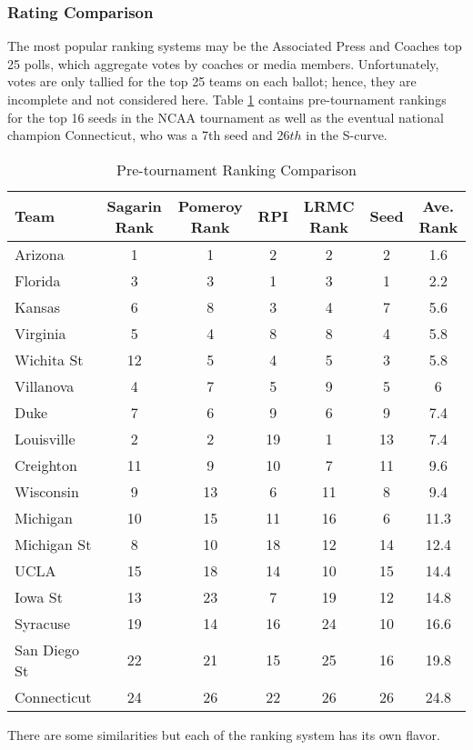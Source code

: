 \subsubsection{Rating Comparison}
The most popular ranking systems may be the Associated Press and Coaches top 25 polls, which aggregate votes by coaches or media members. Unfortunately, votes are only tallied for the top 25 teams on each ballot; hence, they are incomplete and not considered here. Table \ref{tab:ranks} contains pre-tournament rankings for the top 16 seeds in the NCAA tournament as well as the eventual national champion Connecticut, who was a 7th seed and 26$th$ in the S-curve.
\begin{table}[h!]
\caption{Pre-tournament Ranking Comparison}
\footnotesize
\centering
\begin{tabular}{l|ccccc|c}
  \hline
  \hline
 Team & Sagarin Rank &  Pomeroy Rank & RPI & LRMC Rank & Seed& Ave. Rank  \\ 
  \hline
 Arizona         & 1  &1    & 2     & 2 & 2& 1.6  \\
 Florida          & 3  &3    &1      &3 & 1& 2.2\\
  Kansas         & 6  &8    & 3    & 4& 7 &5.6\\
 Virginia         & 5  &4     &8    &8 & 4 &5.8\\
 Wichita St    & 12 &5      & 4    &5 & 3 &5.8\\
 Villanova      & 4  &7    & 5    & 9 & 5 &6\\
 Duke             & 7  &6     &9     &6 &9&7.4\\
 Louisville      & 2  &2    & 19   & 1 &13 & 7.4\\
  Creighton &  11 &   9 & 10   &7 &11& 9.6\\ 
 Wisconsin  &   9   &13   & 6   &  11 & 8 &9.4\\
 Michigan & 10 & 15& 11& 16& 6 &11.3\\
 Michigan St & 8  &10   & 18 & 12& 14&12.4\\
 UCLA & 15& 18& 14&10 &15 &14.4\\
 Iowa St &13 &23  &7 &19 &12 &14.8 \\
 Syracuse &19 &14  &16 &24 &10 &16.6 \\
 San Diego St&22 &21  &15 &25 &16 &19.8 \\
  \hline
  Connecticut & 24& 26& 22&26& 26&24.8\\
  \hline
   \hline
\end{tabular}
\label{tab:ranks}
\end{table}
There are some similarities but each of the ranking system has its own flavor.